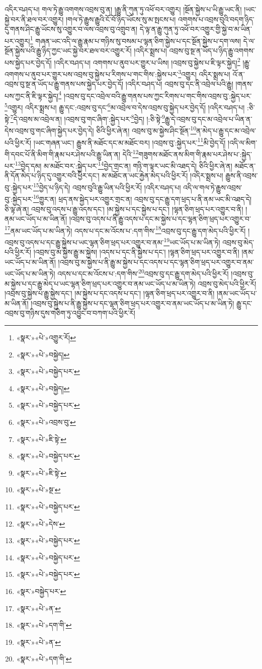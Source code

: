 འདིར་བཤད་པ། གལ་ཏེ་རྒྱུ་འགགས་འབྲས་བུ་ན། །རྒྱུ་ནི་ཀུན་ཏུ་འཕོ་བར་འགྱུར། །སྔོན་སྐྱེས་པ་ཡི་རྒྱུ་ཡང་ནི། །ཡང་སྐྱེ་བར་ནི་ཐལ་བར་འགྱུར། །གལ་ཏེ་རྒྱུས་རྒྱུའི་ངོ་བོ་ཉིད་ཡོངས་སུ་མ་སྤངས་པ། འགགས་པ་འབྲས་བུའི་བདག་ཉིད་དུ་གནས་ཤིང་རྒྱུ་ཡོངས་སུ་འགྱུར་བ་ལས་འབྲས་བུ་འགྲུབ་ན། དེ་ལྟ་ན་རྒྱུ་ཀུན་ཏུ་འཕོ་བར་འགྱུར་གྱི་སྐྱེ་བ་མ་ཡིན་པར་འགྱུར།\footnote{«སྣར་»«པེ་»འགྱུར་རོ།} གཞན་ཡང་འདི་ལ་རྒྱུ་རྣམ་པ་གཉིས་སུ་བསམ་པ་ལྷན་ཅིག་སྐྱེས་པ་དང་སྔོན་སྐྱེས་པ་དག་ལས། དེ་ལ་སྔོན་སྐྱེས་པའི་རྒྱུ་ཉིད་ཀྱང་ཡང་སྐྱེ་བར་ཐལ་བར་འགྱུར་རོ། །འདིར་སྨྲས་པ། འབྲས་བུ་སྔ་ན་ཡོད་པ་ཉིད་རྒྱུ་འགགས་པས་སྐྱེད་པར་བྱེད་དོ། །འདིར་བཤད་པ། འགགས་པ་ནུབ་པར་གྱུར་པ་ཡིས། །འབྲས་བུ་སྐྱེས་པ་ཇི་ལྟར་སྐྱེད།\footnote{«སྣར་»«པེ་»བསྐྱེད།} །རྒྱུ་འགགས་པ་ནུབ་པར་གྱུར་པས་འབྲས་བུ་སྐྱེས་པ་རིགས་པ་གང་གིས་:སྐྱེས་པར་\footnote{«སྣར་»«པེ་»བསྐྱེད་པར་}འགྱུར། འདིར་སྨྲས་པ། འོ་ན་འབྲས་བུ་སྔ་ན་ཡོད་པ་རྒྱུ་གནས་པས་སྐྱེད་པར་བྱེད་དོ། །འདིར་བཤད་པ། འབྲས་བུ་དང་ནི་འབྲེལ་པའི་རྒྱུ། །གནས་པས་ཀྱང་ནི་ཇི་ལྟར་སྐྱེད།\footnote{«སྣར་»«པེ་»བསྐྱེད།} །འབྲས་བུ་དང་འབྲེལ་བའི་རྒྱུ་གནས་པས་ཀྱང་རིགས་པ་གང་གིས་འབྲས་བུ་:སྐྱེད་པར་\footnote{«སྣར་»«པེ་»བསྐྱེད་པར་}འགྱུར། འདིར་སྨྲས་པ། རྒྱུ་དང་:འབྲས་བུ་དང་\footnote{«སྣར་»«པེ་»འབྲས་བུ་}མ་འབྲེལ་བ་དེས་འབྲས་བུ་སྐྱེད་པར་བྱེད་དོ། །འདིར་བཤད་པ། :ཅི་སྟེ་\footnote{«སྣར་»«པེ་»ཇི་སྟེ་}དེ་འབྲས་མ་འབྲེལ་ན། །འབྲས་བུ་གང་ཞིག་:སྐྱེད་པར་\footnote{«སྣར་»«པེ་»བསྐྱེད་པར་}བྱེད། །:ཅི་སྟེ་\footnote{«སྣར་»«པེ་»ཇི་སྟེ་}རྒྱུ་དེ་འབྲས་བུ་དང་མ་འབྲེལ་པ་ཡིན་ན་དེས་འབྲས་བུ་གང་ཞིག་སྐྱེད་པར་བྱེད་དེ། ཅིའི་ཕྱིར་ཞེ་ན། འབྲས་བུ་མ་སྐྱེས་ཤིང་སྔོན་\footnote{«སྣར་»«པེ་»སྔ་}ན་མེད་པ་རྒྱུ་དང་མ་འབྲེལ་པའི་ཕྱིར་རོ། །ཡང་གཞན་ཡང་། རྒྱུས་ནི་མཐོང་དང་མ་མཐོང་བར། །འབྲས་བུ་:སྐྱེད་པར་\footnote{«སྣར་»«པེ་»བསྐྱེད་པར་}མི་བྱེད་དོ། །འདི་ལ་མིག་གི་དབང་པོ་ནི་མིག་གི་རྣམ་པར་ཤེས་པའི་རྒྱུ་ཡིན་ན། དེའི་\footnote{«སྣར་»«པེ་»དེས་}གཟུགས་མཐོང་ནས་མིག་གི་རྣམ་པར་ཤེས་པ་:སྐྱེད་པར་\footnote{«སྣར་»«པེ་»བསྐྱེད་པར་}བྱེད་དམ། མ་མཐོང་བར་:སྐྱེད་པར་\footnote{«སྣར་»«པེ་»བསྐྱེད་པར་}བྱེད་གྲང་ན། གཉི་ག་ལྟར་ཡང་མི་འཐད་དེ། ཅིའི་ཕྱིར་ཞེ་ན། མཐོང་ན་ནི་དོན་མེད་པ་ཉིད་དུ་འགྱུར་བའི་ཕྱིར་དང་། མ་མཐོང་ན་ཡང་རྐྱེན་མེད་པའི་ཕྱིར་རོ། །འདིར་སྨྲས་པ། རྒྱུས་ནི་འབྲས་བུ་:སྐྱེད་པར་\footnote{«སྣར་»«པེ་»བསྐྱེད་པར་}བྱེད་པ་ཉིད་དེ། འབྲས་བུའི་རྒྱུ་ཡིན་པའི་ཕྱིར་རོ། །འདིར་བཤད་པ། འདི་ལ་གལ་ཏེ་རྒྱུས་འབྲས་བུ་:སྐྱེད་པར་\footnote{«སྣར་»བསྐྱེད་པར་}གྱུར་ན། ཕྲད་ནས་སྐྱེད་པར་འགྱུར་གྲང་ན། འབྲས་བུ་དང་རྒྱུ་དག་ཕྲད་པ་ནི་ནམ་ཡང་མི་འཐད་དེ། ཅི་ལྟ་ཞེ་ན། འབྲས་བུ་འདས་པ་རྒྱུ་འདས་དང་། །མ་སྐྱེས་པ་དང་སྐྱེས་པ་དང་། །ལྷན་ཅིག་ཕྲད་པར་འགྱུར་བ་ནི། །ནམ་ཡང་ཡོད་པ་མ་ཡིན་ནོ། །འབྲས་བུ་འདས་པ་ནི་རྒྱུ་འདས་པ་དང་མ་སྐྱེས་པ་དང་ལྷན་ཅིག་ཕྲད་པར་འགྱུར་བ་\footnote{«སྣར་»«པེ་»ན་}ནམ་ཡང་ཡོད་པ་མ་ཡིན་ཏེ། འདས་པ་དང་མ་འོངས་པ་:དག་གིས་\footnote{«སྣར་»«པེ་»དག་གི་}འབྲས་བུ་དང་རྒྱུ་དག་མེད་པའི་ཕྱིར་རོ། །འབྲས་བུ་འདས་པ་དང་རྒྱུ་སྐྱེས་པ་ཡང་ལྷན་ཅིག་ཕྲད་པར་འགྱུར་བ་ནམ་\footnote{«སྣར་»«པེ་»ན་}ཡང་ཡོད་པ་མ་ཡིན་ཏེ། འབྲས་བུ་མེད་པའི་ཕྱིར་རོ། །འབྲས་བུ་མ་སྐྱེས་རྒྱུ་མ་སྐྱེས། །འདས་པ་དང་ནི་སྐྱེས་པ་དང་། །ལྷན་ཅིག་ཕྲད་པར་འགྱུར་བ་ནི། །ནམ་ཡང་ཡོད་པ་མ་ཡིན་ནོ། །འབྲས་བུ་མ་སྐྱེས་པ་ནི་རྒྱུ་མ་སྐྱེས་པ་དང་འདས་པ་དང་ལྷན་ཅིག་ཕྲད་པར་འགྱུར་བ་ནམ་ཡང་ཡོད་པ་མ་ཡིན་ཏེ། འདས་པ་དང་མ་འོངས་པ་:དག་གིས་\footnote{«སྣར་»«པེ་»དག་གི་}འབྲས་བུ་དང་རྒྱུ་དག་མེད་པའི་ཕྱིར་རོ། །འབྲས་བུ་མ་སྐྱེས་པ་དང་རྒྱུ་མེད་པ་ཡང་ལྷན་ཅིག་ཕྲད་པར་འགྱུར་བ་ནམ་ཡང་ཡོད་པ་མ་ཡིན་ཏེ། འབྲས་བུ་མེད་པའི་ཕྱིར་རོ། །འབྲས་བུ་སྐྱེས་པ་རྒྱུ་སྐྱེས་དང་། །མ་སྐྱེས་པ་དང་འདས་པ་དང་། །ལྷན་ཅིག་ཕྲད་པར་འགྱུར་བ་ནི། །ནམ་ཡང་ཡོད་པ་མ་ཡིན་ནོ། །འབྲས་བུ་སྐྱེས་པ་ནི་རྒྱུ་སྐྱེས་པ་དང་ལྷན་ཅིག་ཕྲད་པར་འགྱུར་བ་ནམ་ཡང་ཡོད་པ་མ་ཡིན་ཏེ། རྒྱུ་དང་འབྲས་བུ་གཉིས་དུས་གཅིག་ཏུ་འབྱུང་བ་བཀག་པའི་ཕྱིར་རོ། 